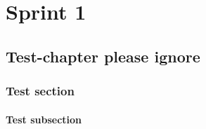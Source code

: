 \part{Sprint 1}
\chapter{Test-chapter please ignore}
\section{Test section}
\subsection{Test subsection}